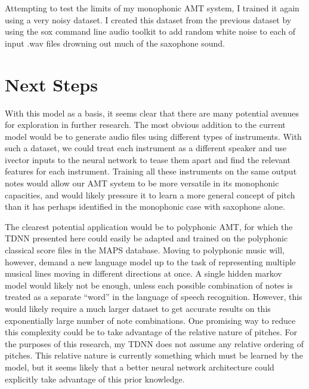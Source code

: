 \documentclass[conference]{IEEEtran}
\begin{document}
Attempting to test the limits of my monophonic AMT system, I trained it again using a very noisy dataset. I created this dataset from the previous dataset by using the sox command line audio toolkit to add random white noise to each of input .wav files drowning out much of the saxophone sound.







\section{Next Steps}

With this model as a basis, it seems clear that there are many potential avenues for exploration in further research. The most obvious addition to the current model would be to generate audio files using different types of instruments. With such a dataset, we could treat each instrument as a different speaker and use ivector inputs to the neural network to tease them apart and find the relevant features for each instrument. Training all these instruments on the same output notes would allow our AMT system to be more versatile in its monophonic capacities, and would likely pressure it to learn a more general concept of pitch than it has perhaps identified in the monophonic case with saxophone alone.

The clearest potential application would be to polyphonic AMT, for which the TDNN presented here could easily be adapted and trained on the polyphonic classical score files in the MAPS database. Moving to polyphonic music will, however, demand a new language model up to the task of representing multiple musical lines moving in different directions at once. A single hidden markov model would likely not be enough, unless each possible combination of notes is treated as a separate ``word'' in the language of speech recognition. However, this would likely require a much larger dataset to get accurate results on this exponentially large number of note combinations. One promising way to reduce this complexity could be to take advantage of the relative nature of pitches. For the purposes of this research, my TDNN does not assume any relative ordering of pitches. This relative nature is currently something which must be learned by the model, but it seems likely that a better neural network architecture could explicitly take advantage of this prior knowledge.
\end{document}
